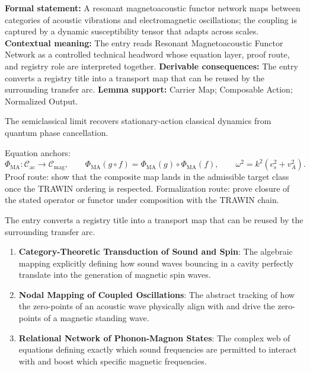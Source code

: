 \begingroup\footnotesize\setlength{\emergencystretch}{3em}\sloppy
\textbf{Formal statement:} A resonant magnetoacoustic functor network maps between categories of acoustic vibrations and electromagnetic oscillations; the coupling is captured by a dynamic susceptibility tensor that adapts across scales. \textbf{Contextual meaning:} The entry reads Resonant Magnetoacoustic Functor Network as a controlled technical headword whose equation layer, proof route, and registry role are interpreted together. \textbf{Derivable consequences:} The entry converts a registry title into a transport map that can be reused by the surrounding transfer arc. \textbf{Lemma support:} Carrier Map; Composable Action; Normalized Output.\par
\endgroup

The semiclassical limit recovers stationary-action classical dynamics from quantum phase cancellation.

Equation anchors:
\[
\Phi_{\mathrm{MA}}:\mathcal{C}_{\mathrm{ac}}\to\mathcal{C}_{\mathrm{mag}},
\qquad
\Phi_{\mathrm{MA}}(g\circ f)=\Phi_{\mathrm{MA}}(g)\circ\Phi_{\mathrm{MA}}(f),
\qquad
\omega^2=k^2(c_s^2+v_A^2).
\]
Proof route: show that the composite map lands in the admissible target class once the TRAWIN ordering is respected. Formalization route: prove closure of the stated operator or functor under composition with the TRAWIN chain.

The entry converts a registry title into a transport map that can be reused by the surrounding transfer arc.
\endgroup

\begin{enumerate}[leftmargin=1.6em,itemsep=6pt,topsep=4pt]
\item \textbf{Category-Theoretic Transduction of Sound and Spin}: The algebraic mapping explicitly defining how sound waves bouncing in a cavity perfectly translate into the generation of magnetic spin waves.
\item \textbf{Nodal Mapping of Coupled Oscillations}: The abstract tracking of how the zero-points of an acoustic wave physically align with and drive the zero-points of a magnetic standing wave.
\item \textbf{Relational Network of Phonon-Magnon States}: The complex web of equations defining exactly which sound frequencies are permitted to interact with and boost which specific magnetic frequencies.
\end{enumerate}

